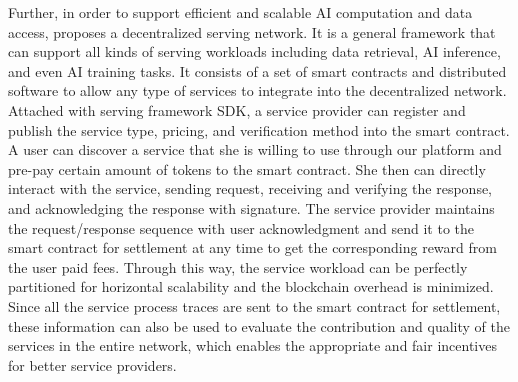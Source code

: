 Further, in order to support efficient and scalable AI computation and data access, \projabbrev proposes a decentralized serving network.
It is a general framework that can support all kinds of serving workloads including data retrieval, AI inference, and even AI training tasks. 
It consists of a set of smart contracts and distributed software to allow any type of services to integrate into the decentralized network.
Attached with \projabbrev serving framework SDK, a service provider can register and publish the service type, pricing, and verification method into the smart contract.
A user can discover a service that she is willing to use through our platform and pre-pay certain amount of \projabbrev tokens to the smart contract.
She then can directly interact with the service, sending request, receiving and verifying the response, and acknowledging the response with signature.
The service provider maintains the request/response sequence with user acknowledgment and send it to the smart contract for settlement at any time to get the corresponding reward from the user paid fees. 
Through this way, the service workload can be perfectly partitioned for horizontal scalability and the blockchain overhead is minimized. 
Since all the service process traces are sent to the smart contract for settlement, these information can also be used to evaluate the contribution and quality of the services in the entire network, which enables the appropriate and fair incentives for better service providers.






